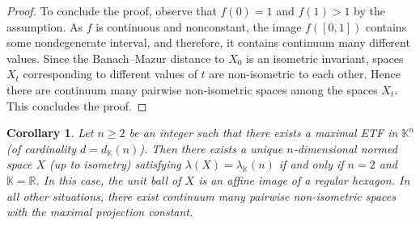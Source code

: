 \documentclass[12pt, reqno]{amsart}
\newtheorem{cor}[twr]{Corollary}
\theoremstyle{definition}
\theoremstyle{remark}
\numberwithin{equation}{section}
\begin{document}
\begin{proof}
To conclude the proof, observe that $f(0)=1$ and $f(1)>1$ by the assumption. As $f$ is continuous and nonconstant, the image $f([0, 1])$ contains some nondegenerate interval, and therefore, it contains continuum many different values. Since the Banach--Mazur distance to $X_0$ is an isometric invariant, spaces $X_t$ corresponding to different values of $t$ are non-isometric to each other. Hence there are continuum many pairwise non-isometric spaces among the spaces $X_t$. This concludes the proof.

\end{proof}

\begin{cor}
\label{coruniq}
Let $n \geq 2$ be an integer such that there exists a maximal ETF in $\mathbb{K}^n$ (of cardinality $d = d_{\mathbb{K}}(n)$). Then there exists a unique $n$-dimensional normed space $X$ (up to isometry) satisfying $\lambda(X)=\lambda_{\mathbb{K}}(n)$ if and only if $n=2$ and $\mathbb{K}=\mathbb{R}$. In this case, the unit ball of $X$ is an affine image of a regular hexagon. In all other situations, there exist continuum many pairwise non-isometric spaces with the maximal projection constant.
\end{cor}
\end{document}
